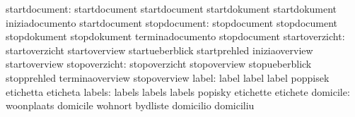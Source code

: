                    startdocument: startdocument                    startdocument
                                  startdokument                    startdokument
                                  iniziadocumento                  startdocument
                    stopdocument: stopdocument                     stopdocument
                                  stopdokument                     stopdokument
                                  terminadocumento                 stopdocument
                  startoverzicht: startoverzicht                   startoverview
                                  startueberblick                  startprehled
                                  iniziaoverview                   startoverview %
                   stopoverzicht: stopoverzicht                    stopoverview
                                  stopueberblick                   stopprehled
                                  terminaoverview                  stopoverview
                           label: label                            label
                                  label                            poppisek
                                  etichetta                        eticheta
%
%
%
                          labels: labels                           labels
                                  labels                           popisky
                                  etichette                        etichete
                        domicile: woonplaats                       domicile
                                  wohnort                          bydliste
                                  domicilio                        domiciliu

\stopcommands


\stoplogginginterface

\endinput
